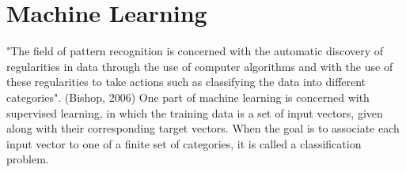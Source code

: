 \section{Machine Learning}

"The field of pattern recognition is concerned with the automatic discovery of regularities in data through the use of computer algorithms and with the use of these regularities to take actions such as classifying the data into different categories". (Bishop, 2006)
One part of machine learning is concerned with supervised learning, in which the training data is a set of input vectors, given along with their corresponding target vectors. When the goal is to associate each input vector to one of a finite set of categories, it is called a classification problem.

